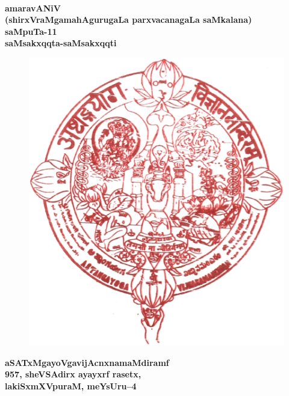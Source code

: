 
\thispagestyle{empty}
~\phantom{a}
\vfill

\begin{center}
{\Huge\bf amaravANiV}\\[15pt]
{\Large\bf (shirxVraMgamahAgurugaLa parxvacanagaLa saMkalana)}\\[15pt]
{\Large\bf saMpuTa-11}\\[15pt]
{\Huge\bf saMsakxqqta-saMsakxqqti}
\end{center}

\begin{figure}[h]
\centering
{\includegraphics[scale=.14]{0000a.eps}}
\end{figure}

\begin{center}
{\Huge\bf aSATxMgayoVgavijAcnxnamaMdiramf}\\[15pt]
{\Large\bf 957, sheVSAdirx ayayxrf rasetx,}\\[15pt]
{\Large\bf lakiSxmXVpuraM, meYsUru--4}
\end{center}

\vfill
\eject

\thispagestyle{empty}
~\phantom{a}


